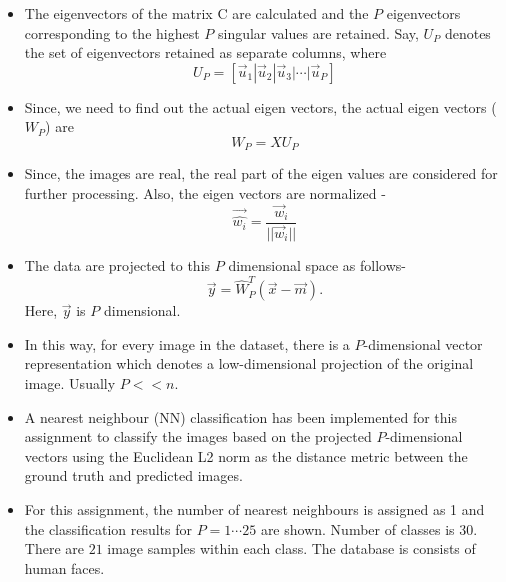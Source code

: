 \documentclass{article}
\begin{document}
\begin{itemize}
\item The eigenvectors of the matrix C are calculated and the $P$ eigenvectors corresponding to the highest $P$ singular values are retained. Say, $U_P$ denotes the set of eigenvectors retained as separate columns, where
\begin{equation}
	U_P = [\vec{u}_1 | \vec{u}_2 | \vec{u}_3 | \cdots | \vec{u}_P]
\end{equation}
\item Since, we need to find out the actual eigen vectors, the actual eigen vectors ($W_P$) are
\begin{equation}
	W_P = XU_P
\end{equation}
\item Since, the images are real, the real part of the eigen values are considered for further processing. Also, the eigen vectors are normalized -
\begin{equation}
	\vec{\hat{w_i}} = \frac{\vec{w}_i}{||\vec{w}_i||}
\end{equation}
\item The data are projected to this $P$ dimensional  space as follows-
\begin{equation}
\vec{y} = \hat{W}_P^T(\vec{x} - \vec{m}).
\end{equation}
Here, $\vec{y}$ is $P$ dimensional.
\item In this way, for every image in the dataset, there is a $P$-dimensional vector representation which denotes a low-dimensional projection of the original image. Usually $P<<n$.
\item A nearest neighbour (NN) classification has been implemented for this assignment to classify the images based on the projected $P$-dimensional vectors using the Euclidean L2 norm as the distance metric between the ground truth and predicted images.
\item For this assignment, the number of nearest neighbours is assigned as 1 and the classification results for $P=1\cdots 25$ are shown. Number of classes is $30$. There are $21$ image samples within each class. The database is consists of human faces.
\end{itemize}
\end{document}
